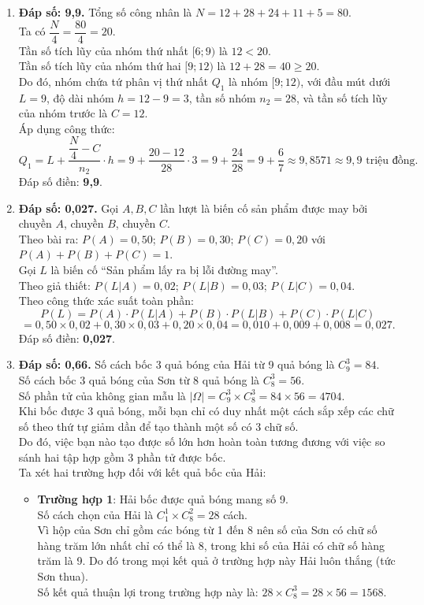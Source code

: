 \documentclass[12pt,a4paper]{article}
\begin{document}
\begin{enumerate}[label=\textbf{Câu \arabic*:}, leftmargin=*]
\item \textbf{Đáp số: 9,9.}
Tổng số công nhân là $N = 12 + 28 + 24 + 11 + 5 = 80$.\\
Ta có $\dfrac{N}{4} = \dfrac{80}{4} = 20$.\\
Tần số tích lũy của nhóm thứ nhất $[6; 9)$ là $12 < 20$.\\
Tần số tích lũy của nhóm thứ hai $[9; 12)$ là $12 + 28 = 40 \ge 20$.\\
Do đó, nhóm chứa tứ phân vị thứ nhất $Q_1$ là nhóm $[9; 12)$, với đầu mút dưới $L = 9$, độ dài nhóm $h = 12 - 9 = 3$, tần số nhóm $n_2 = 28$, và tần số tích lũy của nhóm trước là $C = 12$.\\
Áp dụng công thức:
$$Q_1 = L + \dfrac{\dfrac{N}{4} - C}{n_2} \cdot h = 9 + \dfrac{20 - 12}{28} \cdot 3 = 9 + \dfrac{24}{28} = 9 + \dfrac{6}{7} \approx 9{,}8571 \approx 9{,}9\text{ triệu đồng}.$$
Đáp số điền: \textbf{9,9}.

\item \textbf{Đáp số: 0,027.}
Gọi $A, B, C$ lần lượt là biến cố sản phẩm được may bởi chuyền $A$, chuyền $B$, chuyền $C$.\\
Theo bài ra: $P(A) = 0{,}50$; $P(B) = 0{,}30$; $P(C) = 0{,}20$ với $P(A) + P(B) + P(C) = 1$.\\
Gọi $L$ là biến cố ``Sản phẩm lấy ra bị lỗi đường may''.\\
Theo giả thiết: $P(L|A) = 0{,}02$; $P(L|B) = 0{,}03$; $P(L|C) = 0{,}04$.\\
Theo công thức xác suất toàn phần:
$$P(L) = P(A) \cdot P(L|A) + P(B) \cdot P(L|B) + P(C) \cdot P(L|C)$$
$$= 0{,}50 \times 0{,}02 + 0{,}30 \times 0{,}03 + 0{,}20 \times 0{,}04 = 0{,}010 + 0{,}009 + 0{,}008 = 0{,}027.$$
Đáp số điền: \textbf{0,027}.

\item \textbf{Đáp số: 0,66.}
Số cách bốc 3 quả bóng của Hải từ 9 quả bóng là $C_9^3 = 84$.\\
Số cách bốc 3 quả bóng của Sơn từ 8 quả bóng là $C_8^3 = 56$.\\
Số phần tử của không gian mẫu là $|\Omega| = C_9^3 \times C_8^3 = 84 \times 56 = 4704$.\\
Khi bốc được 3 quả bóng, mỗi bạn chỉ có duy nhất một cách sắp xếp các chữ số theo thứ tự giảm dần để tạo thành một số có 3 chữ số.\\
Do đó, việc bạn nào tạo được số lớn hơn hoàn toàn tương đương với việc so sánh hai tập hợp gồm 3 phần tử được bốc.\\
Ta xét hai trường hợp đối với kết quả bốc của Hải:
\begin{itemize}
    \item \textbf{Trường hợp 1}: Hải bốc được quả bóng mang số 9.\\
    Số cách chọn của Hải là $C_1^1 \times C_8^2 = 28$ cách.\\
    Vì hộp của Sơn chỉ gồm các bóng từ 1 đến 8 nên số của Sơn có chữ số hàng trăm lớn nhất chỉ có thể là 8, trong khi số của Hải có chữ số hàng trăm là 9. Do đó trong mọi kết quả ở trường hợp này Hải luôn thắng (tức Sơn thua).\\
    Số kết quả thuận lợi trong trường hợp này là: $28 \times C_8^3 = 28 \times 56 = 1568$.
    

\end{itemize}
\end{enumerate}
\end{document}
